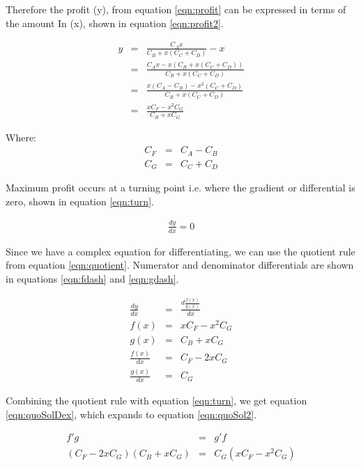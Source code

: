 \documentclass[runningheads]{llncs}
\begin{document}
	Therefore the profit (y), from equation \ref{eqn:profit} can be expressed in terms of the amount In (x), shown in equation \ref{eqn:profit2}.
	
	\begin{eqnarray}
		y  &=& \frac{C_{A} x}{C_{B} + x(C_{C} + C_{D})} - x \label{eqn:profit2}\\
		&=& \frac{C_{A} x - x(C_{B} + x(C_{C} + C_{D}))}{C_{B} + x(C_{C} + C_{D})} \label{eqn:profit3}\\
		&=& \frac{x(C_{A} - C_{B}) - x^2(C_{C} + C_{D})}{C_{B} + x(C_{C} + C_{D})} \label{eqn:profit4}\\
		&=& \frac{x C_{F} - x^2 C_{G} }{C_{B} + x C_{G}} \label{eqn:profit5}
	\end{eqnarray}
	
	Where:
	\begin{eqnarray}
		C_{F}  &=& C_{A} - C_{B}\\
		C_{G}  &=& C_{C} + C_{D}
	\end{eqnarray}
	
	Maximum profit occurs at a turning point i.e. where the gradient or differential is zero, shown in equation \ref{eqn:turn}.
	
	\begin{eqnarray}
		\frac{dy}{dx} = 0 \label{eqn:turn}
	\end{eqnarray}
	
	Since we have a complex equation for differentiating, we can use the quotient rule from equation \ref{eqn:quotient}. Numerator and denominator differentials are shown in equations \ref{eqn:fdash} and \ref{eqn:gdash}.
	
	\begin{eqnarray}
		\frac{dy}{dx} &=& \frac{d \frac{ f(x)}{g(x)}}{dx} \label{eqn:turn2}\\
		f(x) &=& x C_{F} - x^2 C_{G} \label{eqn:f}\\
		g(x) &=& C_{B} + x C_{G} \label{eqn:g}\\
		\frac{f(x)}{dx} &=& C_{F} - 2 x C_{G} \label{eqn:fdash}\\
		\frac{g(x)}{dx} &=& C_{G} \label{eqn:gdash}
	\end{eqnarray}
	
	Combining the quotient rule with equation \ref{eqn:turn}, we get equation \ref{eqn:quoSolDex}, which expands to equation \ref{eqn:quoSol2}.
	
	\begin{eqnarray}
		f'g &=& g'f \label{eqn:quoSolDex}\\
		(C_{F} - 2 x C_{G})(C_{B} + x C_{G}) &=& C_{G} ( x C_{F} - x^2 C_{G}) \label{eqn:quoSol2}
	\end{eqnarray}
	
\end{document}
